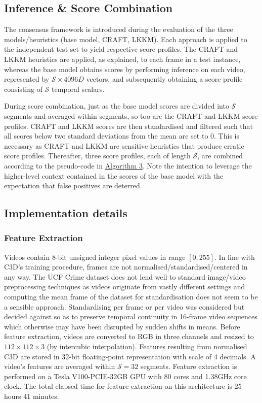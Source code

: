 \documentclass[sigplan,authorversion,nonacm, 9pt]{acmart}
\begin{document}
\subsection{Inference \& Score Combination} \label{sec:infscorecomb}
The consensus framework is introduced during the evaluation of the three models/heuristics (base model, CRAFT, LKKM). Each approach is applied to the independent test set to yield respective score profiles. The CRAFT and LKKM heuristics are applied, as explained, to each frame in a test instance, whereas the base model obtains scores by performing inference on each video, represented by $\mathcal{S} \times 4096D$ vectors, and subsequently obtaining a score profile consisting of $\mathcal{S}$ temporal scalars.
\par
During score combination, just as the base model scores are divided into $\mathcal{S}$ segments and averaged within segments, so too are the CRAFT and LKKM score profiles. CRAFT and LKKM scores are then standardised and filtered such that all scores below two standard deviations from the mean are set to 0. This is necessary as CRAFT and LKKM are sensitive heuristics that produce erratic score profiles. Thereafter, three score profiles, each of length $\mathcal{S}$, are combined according to the pseudo-code in \hyperref[fig:combine]{Algorithm 3}. Note the intention to leverage the higher-level context contained in the scores of the base model with the expectation that false positives are deterred.

\subsection{Implementation details}
\subsubsection{Feature Extraction} \label{sec:featex}
 Videos contain 8-bit unsigned integer pixel values in range $[0, 255]$. In line with C3D's training procedure, frames are not normalised/standardised/centered in any way. The UCF Crime dataset does not lend well to standard image/video preprocessing techniques as videos originate from vastly different settings and computing the mean frame of the dataset for standardisation does not seem to be a sensible approach. Standardising per frame or per video was considered but decided against so as to preserve temporal continuity in 16-frame video sequences which otherwise may have been disrupted by sudden shifts in means.
 Before feature extraction, videos are converted to RGB in three channels and resized to $112 \times 112 \times 3$ (by intercubic interpolation). 
 Features resulting from normalised C3D are stored in 32-bit floating-point representation with scale of 4 decimals. A video's features are averaged within $\mathcal{S} = 32$ segments.
 Feature extraction is performed on a Tesla V100-PCIE-32GB GPU with 80 cores and 1.38GHz core clock. The total elapsed time for feature extraction on this architecture is 25 hours 41 minutes.
 
\end{document}
